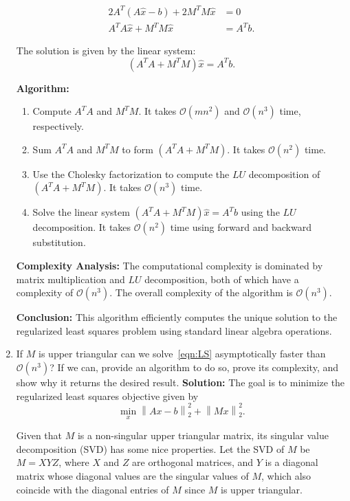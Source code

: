 \documentclass[11pt,onecolumn]{article}
\newcommand{\cO}{\mathcal{O}}
\begin{document}
\begin{enumerate}[label=(\alph*)]
          \begin{align*}
              2A^T(A\hat{x} - b) + 2M^TM\hat{x} & = 0     \\
              A^TA\hat{x} + M^TM\hat{x}         & = A^Tb.
          \end{align*}


          The solution is given by the linear system:
          \[
              (A^TA + M^TM)\hat{x} = A^Tb.
          \]

          \textbf{Algorithm:}
          \begin{enumerate}
              \item Compute $A^TA$ and $M^TM$. It takes $\mathcal{O}(mn^2)$ and $\mathcal{O}(n^3)$ time, respectively.
              \item Sum $A^TA$ and $M^TM$ to form $(A^TA + M^TM)$. It takes $\mathcal{O}(n^2)$ time.
              \item Use the Cholesky factorization to compute the $LU$ decomposition of $(A^TA + M^TM)$. It takes $\mathcal{O}(n^3)$ time.
              \item Solve the linear system $(A^TA + M^TM)\hat{x} = A^Tb$ using the $LU$ decomposition. It takes $\mathcal{O}(n^2)$ time using forward and backward substitution.
          \end{enumerate}

          \textbf{Complexity Analysis:}
          The computational complexity is dominated by matrix multiplication and $LU$ decomposition, both of which have a complexity of $\mathcal{O}(n^3)$. The overall complexity of the algorithm is $\mathcal{O}(n^3)$.

          \textbf{Conclusion:}
          This algorithm efficiently computes the unique solution to the regularized least squares problem using standard linear algebra operations.


    \item If $M$ is upper triangular can we solve~\eqref{eqn:LS} asymptotically faster than $\cO(n^3)$? If we can, provide an algorithm to do so, prove its complexity, and show why it returns the desired result.
          \textbf{Solution:}
          The goal is to minimize the regularized least squares objective given by
          \[ \min_{x} \left\| Ax - b \right\|_2^2 + \left\| Mx \right\|_2^2. \]

          Given that \( M \) is a non-singular upper triangular matrix, its singular value decomposition (SVD) has some nice properties. Let the SVD of \( M \) be \( M = XYZ \), where \( X \) and \( Z \) are orthogonal matrices, and \( Y \) is a diagonal matrix whose diagonal values are the singular values of \( M \), which also coincide with the diagonal entries of \( M \) since \( M \) is upper triangular.


\end{enumerate}
\end{document}
